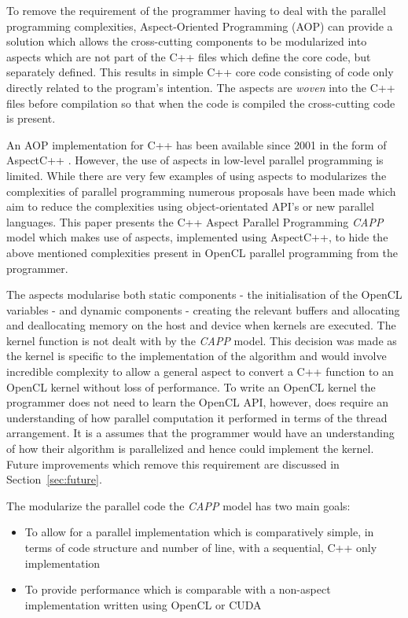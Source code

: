 \documentclass{sig-alternate-05-2015}
\begin{document}
To remove the requirement of the programmer having to deal with the parallel
programming complexities, 
Aspect-Oriented Programming  (AOP) \cite{gregor:aop} can provide a solution which 
allows the cross-cutting components to be modularized into aspects which are not
part of the C++ files which define the core code, but separately defined. This
results in simple C++ core code consisting of code only directly related to 
the program's intention. The aspects are \textit{woven} into the C++ files before 
compilation so that when the code is compiled the cross-cutting code is present.

An AOP implementation for C++ has been available  since 2001 in the form of AspectC++ 
\cite{gal:acppprop} \cite{olaf:app}. However, the use of aspects in low-level
parallel programming is limited. While there are very few examples of using
aspects to modularizes the complexities of parallel programming numerous proposals 
have been made which aim to reduce the complexities using object-orientated
API's or new parallel languages.  This paper presents the C++ Aspect Parallel
Programming \textit{CAPP} model which makes use of aspects, implemented using AspectC++, to 
hide the above mentioned complexities present in OpenCL parallel programming 
from the programmer. 

The aspects modularise both static components - the initialisation of the
OpenCL variables - and dynamic components - creating the relevant buffers
and allocating and deallocating memory on the host and device when kernels are
executed. The kernel function is not dealt with by the \textit{CAPP} model. This
decision was made as the kernel is specific to the implementation of the
algorithm and would involve incredible complexity to allow a general aspect to
convert a C++ function to an OpenCL kernel without loss of performance. To write 
an OpenCL kernel the programmer does not need to learn the OpenCL API, however,
does require an understanding of how parallel computation it performed in terms of
the thread arrangement. It is a assumes that the programmer would have an
understanding of how their algorithm is parallelized and hence could implement
the kernel. Future improvements which remove this requirement are discussed in
Section~\ref{sec:future}.

The modularize the parallel code the \textit{CAPP} model has two main goals:
\begin{itemize}
	\item{To allow for a parallel implementation 
			which is comparatively simple, in terms of code structure and number
			of line, with a sequential, C++ only implementation
		}
	\item{To provide performance which is comparable with a non-aspect
			implementation written using OpenCL or CUDA
		}
\end{itemize}
\end{document}

